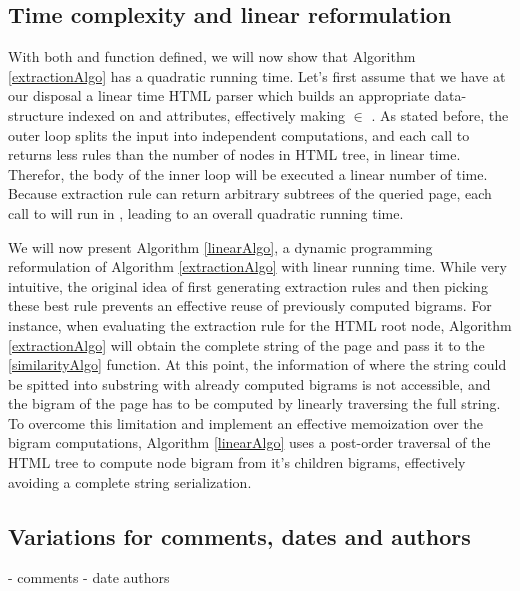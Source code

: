 \similarityAlgo

\subsection{Time complexity and linear reformulation}

%
With both  and  function defined, we will now show that Algorithm \ref{extractionAlgo} has a quadratic running time. Let's first assume that we have at our disposal a linear time HTML parser which builds an appropriate data-structure indexed on  and  attributes, effectively making  $\in$ . As stated before, the outer loop splits the input into independent computations, and each call to  returns less rules than the number of nodes in HTML tree, in linear time. Therefor, the body of the inner loop will be executed a linear number of time. Because extraction rule can return arbitrary subtrees of the queried page, each call to  will run in , leading to an overall quadratic running time.

%
We will now present Algorithm \ref{linearAlgo}, a dynamic programming reformulation of Algorithm \ref{extractionAlgo} with linear running time. While very intuitive, the original idea of first generating extraction rules and then picking these best rule prevents an effective reuse of previously computed bigrams. For instance, when evaluating the extraction rule for the HTML root node, Algorithm \ref{extractionAlgo} will obtain the complete string of the page and pass it to the \ref{similarityAlgo} function. At this point, the information of where the string could be spitted into substring with already computed bigrams is not accessible, and the bigram of the page has to be computed by linearly traversing the full string. To overcome this limitation and implement an effective memoization over the bigram computations, Algorithm \ref{linearAlgo} uses a post-order traversal of the HTML tree to compute node bigram from it's children bigrams, effectively avoiding a complete string serialization.

\linearAlgo



\subsection{Variations for comments, dates and authors}
- comments
- date authors
